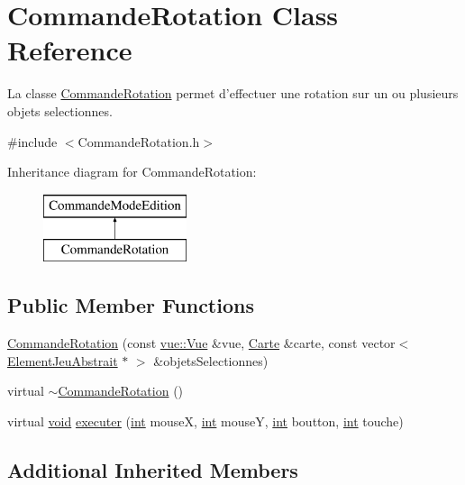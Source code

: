 \hypertarget{class_commande_rotation}{\section{Commande\-Rotation Class Reference}
\label{class_commande_rotation}
}


La classe \hyperlink{class_commande_rotation}{Commande\-Rotation} permet d'effectuer une rotation sur un ou plusieurs objets selectionnes.  




{\ttfamily \#include $<$Commande\-Rotation.\-h$>$}

Inheritance diagram for Commande\-Rotation\-:\begin{figure}[H]
\begin{center}
\leavevmode
\includegraphics[height=2.000000cm]{class_commande_rotation}
\end{center}
\end{figure}
\subsection*{Public Member Functions}
\begin{DoxyCompactItemize}
\item 
\hyperlink{class_commande_rotation_a761e2cdab1e1b916643bea637070646d}{Commande\-Rotation} (const \hyperlink{classvue_1_1_vue}{vue\-::\-Vue} \&vue, \hyperlink{class_carte}{Carte} \&carte, const vector$<$ \hyperlink{class_element_jeu_abstrait}{Element\-Jeu\-Abstrait} $\ast$ $>$ \&objets\-Selectionnes)
\item 
virtual \hyperlink{class_commande_rotation_a5e0b92f5c0dd1d93b9f608c02d94608c}{$\sim$\-Commande\-Rotation} ()
\item 
virtual \hyperlink{wglew_8h_aeea6e3dfae3acf232096f57d2d57f084}{void} \hyperlink{class_commande_rotation_a2ee611526f6ed7720821dbf8e577fe64}{executer} (\hyperlink{wglew_8h_a500a82aecba06f4550f6849b8099ca21}{int} mouse\-X, \hyperlink{wglew_8h_a500a82aecba06f4550f6849b8099ca21}{int} mouse\-Y, \hyperlink{wglew_8h_a500a82aecba06f4550f6849b8099ca21}{int} boutton, \hyperlink{wglew_8h_a500a82aecba06f4550f6849b8099ca21}{int} touche)
\end{DoxyCompactItemize}
\subsection*{Additional Inherited Members}



